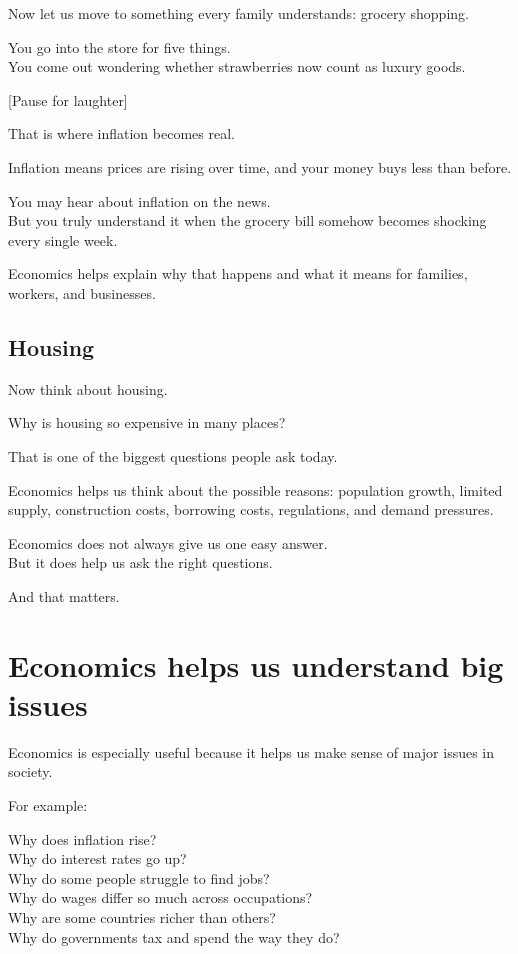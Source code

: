 \documentclass[12pt]{article}
\begin{document}
Now let us move to something every family understands: grocery shopping.

You go into the store for five things.\\
You come out wondering whether strawberries now count as luxury goods.

[Pause for laughter]

That is where inflation becomes real.

Inflation means prices are rising over time, and your money buys less than before.

You may hear about inflation on the news.\\
But you truly understand it when the grocery bill somehow becomes shocking every single week.

Economics helps explain why that happens and what it means for families, workers, and businesses.

\subsection*{Housing}

Now think about housing.

Why is housing so expensive in many places?

That is one of the biggest questions people ask today.

Economics helps us think about the possible reasons:
population growth, limited supply, construction costs, borrowing costs, regulations, and demand pressures.

Economics does not always give us one easy answer.\\
But it does help us ask the right questions.

And that matters.

\section*{Economics helps us understand big issues}

Economics is especially useful because it helps us make sense of major issues in society.

For example:

Why does inflation rise?\\
Why do interest rates go up?\\
Why do some people struggle to find jobs?\\
Why do wages differ so much across occupations?\\
Why are some countries richer than others?\\
Why do governments tax and spend the way they do?
\end{document}
